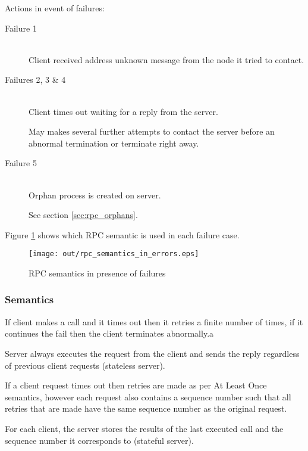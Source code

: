 \documentclass[a4paper]{article}
\begin{document}
Actions in event of failures:

\begin{description}
  \item[Failure 1] \hfill \\
    Client received address unknown message from the node it tried to contact.

  \item[Failures 2, 3 \& 4] \hfill \\
    Client times out waiting for a reply from the server.

    May makes several further attempts to contact the server before an abnormal
    termination or terminate right away.

  \item[Failure 5] \hfill \\
    Orphan process is created on server.

    See section \ref{sec:rpc_orphans}.

\end{description}

Figure \ref{fig:rpc_semantics_in_errors} shows which RPC semantic is used in
each failure case.

\begin{figure}[h!]
  \centering
  \texttt{[image: out/rpc\_semantics\_in\_errors.eps]}
  \caption{RPC semantics in presence of failures}
  \label{fig:rpc_semantics_in_errors}
\end{figure}
\FloatBarrier

\subsubsection{Semantics}


If client makes a call and it times out then it retries a finite number of
times, if it continues the fail then the client terminates abnormally.a

Server always executes the request from the client and sends the reply
regardless of previous client requests (stateless server).


If a client request times out then retries are made as per At Least Once
semantics, however each request also contains a sequence number such that all
retries that are made have the same sequence number as the original request.

For each client, the server stores the results of the last executed call and the
sequence number it corresponds to (stateful server).
\end{document}
